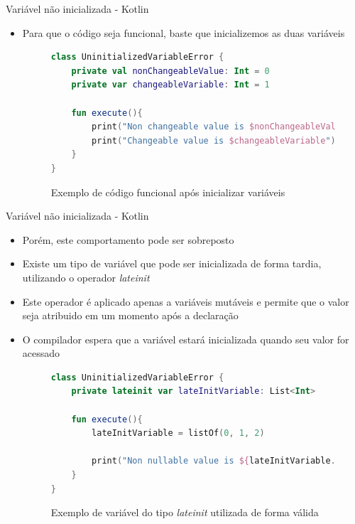 \documentclass[brazilian]{beamer}
\begin{document}
\begin{frame}[fragile]{Variável não inicializada - Kotlin}
    \begin{itemize}
        \item Para que o código seja funcional, baste que inicializemos as duas variáveis
        \begin{figure}[H]
            \centering
            \begin{lstlisting}[language=kotlin]
class UninitializedVariableError {
    private val nonChangeableValue: Int = 0
    private var changeableVariable: Int = 1

    fun execute(){
        print("Non changeable value is $nonChangeableValue")
        print("Changeable value is $changeableVariable")
    }
}
            \end{lstlisting}
            \caption{Exemplo de código funcional após inicializar variáveis}
            \label{fig:kotlin_init_variable}
        \end{figure}
    \end{itemize}
\end{frame}

\begin{frame}[fragile]{Variável não inicializada - Kotlin}
    \begin{itemize}
        \item Porém, este comportamento pode ser sobreposto
        \item Existe um tipo de variável que pode ser inicializada de forma tardia, utilizando o operador \emph{lateinit}
        \item Este operador é aplicado apenas a variáveis mutáveis e permite que o valor seja atribuido em um momento após a declaração
        \item O compilador espera que a variável estará inicializada quando seu valor for acessado
        \begin{figure}[H]
            \centering
            \begin{lstlisting}[language=Kotlin]
class UninitializedVariableError {
    private lateinit var lateInitVariable: List<Int>

    fun execute(){
        lateInitVariable = listOf(0, 1, 2)
        
        print("Non nullable value is ${lateInitVariable.first()}")
    }
}
            \end{lstlisting}
            \caption{Exemplo de variável do tipo \textit{lateinit} utilizada de forma válida}
            \label{fig:kotlin_lateinit_variable_initialized}
        \end{figure}
    \end{itemize}
\end{frame}
\end{document}
